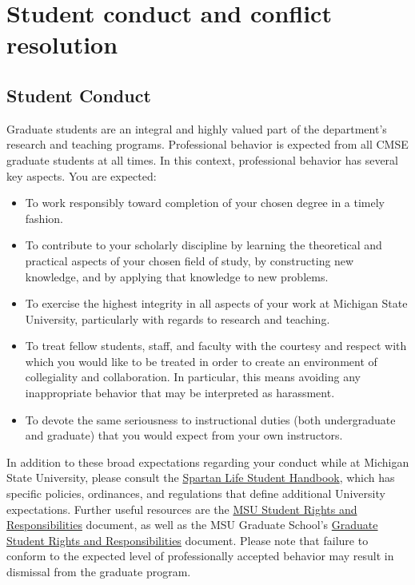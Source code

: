 \section{Student conduct and conflict resolution}

\subsection{Student Conduct}

Graduate students are an integral and highly valued part of the
department's research and teaching programs.  Professional behavior is
expected from all CMSE graduate students at all times.  In this
context, professional behavior has several key aspects.  You are
expected:

\begin{itemize}

\item To work responsibly toward completion of your chosen degree in a
timely fashion.

\item To contribute to your scholarly discipline by learning the
theoretical and practical aspects of your chosen field of study, by
constructing new knowledge, and by applying that knowledge to new
problems.

\item To exercise the highest integrity in all aspects of your work at
Michigan State University, particularly with regards to research and
teaching.

\item To treat fellow students, staff, and faculty with the courtesy
and respect with which you would like to be treated in order to create
an environment of collegiality and collaboration.  In particular, this
means avoiding any inappropriate behavior that may be interpreted as
harassment.

\item To devote the same seriousness to instructional duties (both
undergraduate and graduate) that you would expect from your own
instructors.

\end{itemize}

\noindent
In addition to these broad expectations regarding your conduct while
at Michigan State University, please consult the
\href{http://splife.studentlife.msu.edu/}{Spartan Life Student
Handbook}, which has specific policies, ordinances, and regulations
that define additional University expectations.  Further useful
resources are the
\href{http://splife.studentlife.msu.edu/academic-freedom-for-students-at-michigan-state-university}{MSU
Student Rights and Responsibilities} document, as well as the MSU
Graduate School's \href{https://grad.msu.edu/gsrr}{Graduate Student
Rights and Responsibilities} document.  Please note that failure to
conform to the expected level of professionally accepted behavior may
result in dismissal from the graduate program.

